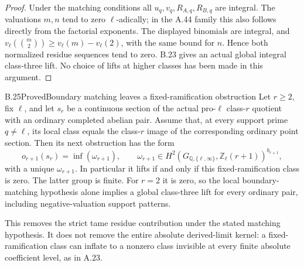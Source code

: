 \begin{proof}
Under the matching conditions all $u_q,v_q,R_{A,q},R_{B,q}$ are
integral. The valuations $m,n$ tend to zero $\ell$-adically;
in the A.44 family this also follows directly from the factorial
exponents. The displayed binomials are integral, and
$v_\ell(\binom m2)\geq v_\ell(m)-v_\ell(2)$, with the same
bound for $n$. Hence both normalized residue sequences tend to
zero. B.23 gives an actual global integral class-three lift. No
choice of lifts at higher classes has been made in this argument.
\end{proof}

\begin{result}{B.25}{Proved}{Boundary matching leaves a fixed-ramification obstruction}
\label{coh:higherboundarygate}
Let $r\geq2$, fix $\ell$, and let $s_r$ be a continuous section of
the actual pro-$\ell$ class-$r$ quotient with an ordinary completed
abelian pair. Assume that, at every support prime $q\ne\ell$,
its local class equals the class-$r$ image of the corresponding
ordinary point section. Then its next obstruction has the form
\[
 o_{r+1}(s_r)=\operatorname{inf}(\omega_{r+1}),\qquad
 \omega_{r+1}\in
 H^2(G_{\mathbb Q,\{\ell,\infty\}},
          \mathbb Z_\ell(r+1))^{b_{r+1}},
\]
with a unique $\omega_{r+1}$. In particular it lifts if and only
if this fixed-ramification class is zero. The latter group is finite.
For $r=2$ it is zero, so the local boundary-matching hypothesis
alone implies a global class-three lift for every ordinary pair,
including negative-valuation support patterns.

This removes the strict tame residue contribution under the stated
matching hypothesis. It does not remove the entire absolute
derived-limit kernel: a fixed-ramification class can inflate to a
nonzero class invisible at every finite absolute coefficient level,
as in A.23.
\end{result}
